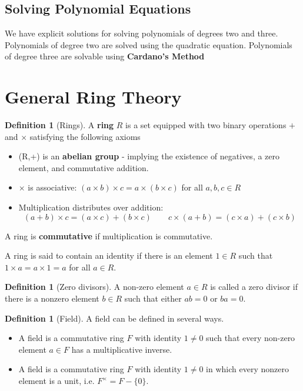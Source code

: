 \documentclass[10pt, oneside, reqno]{amsart}
\theoremstyle{plain}%
\theoremstyle{definition}
\newtheorem{defn}[thm]{Definition}
\theoremstyle{remark}
\begin{document}
\subsection{Solving Polynomial Equations} %
\label{sub:solving_polynomial_equations}
We have explicit solutions for solving polynomials of degrees two and three. Polynomials of degree two are solved using the quadratic equation.  Polynomials of degree three are solvable using \textbf{Cardano's Method}



\section{General Ring Theory} %
\label{cha:general_ring_theory}

\begin{defn}[Rings]
    A \textbf{ring} $R$ is a set equipped with two binary operations $+$ and $\times$ satisfying the following axioms
    \begin{itemize}
        \item (R,+) is an \textbf{abelian group} -  implying the existence of negatives, a zero element, and commutative addition.
        \item $\times$ is associative: $(a \times b) \times c = a \times (b \times c)$ for all $a,b,c \in R$
        \item Multiplication distributes over addition: \[
            (a + b) \times c  = (a \times c) + (b \times c) \qquad c \times (a + b) = (c \times a) + (c \times b)
        \]
    \end{itemize}
    
    A ring is \textbf{commutative} if multiplication is commutative.  
    
    A ring is said to contain an identity if there is an element $1 \in R$ such that $1 \times a = a \times 1 = a$ for all $a \in R$.
\end{defn}

\begin{defn}[Zero divisors]
    A non-zero element $a \in R$ is called a zero divisor if there is a nonzero element $b \in R$ such that either $ab = 0$ or $ba = 0$. 
\end{defn}

\begin{defn}[Field]
    A field can be defined in several ways.
    \begin{itemize}
        \item A field is a commutative ring $F$ with identity $1 \neq 0$ such that every non-zero element $a \in F$ has a multiplicative inverse.
        \item A field is a commutative ring $F$ with identity $1 \neq 0$ in which every nonzero element is a unit, i.e. $F^{\times} = F - \{0\}$.
    \end{itemize}
\end{defn}
\end{document}
